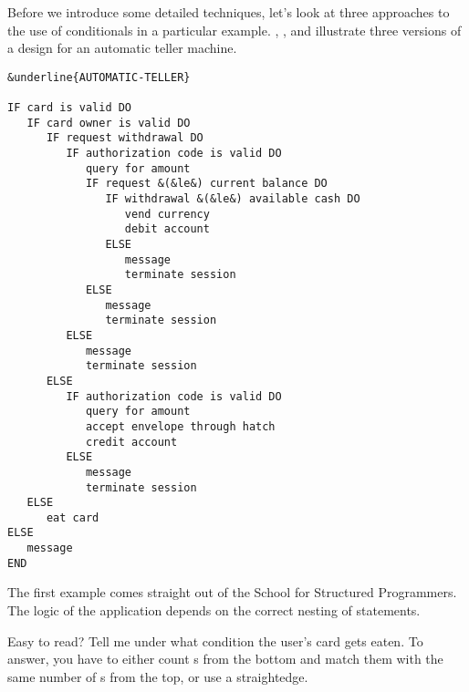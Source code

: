 %
Before we introduce some detailed techniques, let's look at three approaches
to the use of conditionals in a particular example. ,
, and  illustrate three versions of a design for an
automatic teller machine.

\begin{figure*}[tttt]
\begin{center}
\small\begin{BVerbatim}[commandchars=\&\{\},baselinestretch=0.85]
&underline{AUTOMATIC-TELLER}

IF card is valid DO
   IF card owner is valid DO
      IF request withdrawal DO
         IF authorization code is valid DO
            query for amount
            IF request &(&le&) current balance DO
               IF withdrawal &(&le&) available cash DO
                  vend currency
                  debit account
               ELSE
                  message
                  terminate session
            ELSE
               message
               terminate session
         ELSE
            message
            terminate session
      ELSE
         IF authorization code is valid DO
            query for amount
            accept envelope through hatch
            credit account
         ELSE
            message
            terminate session
   ELSE
      eat card
ELSE
   message
END
\end{BVerbatim}
\end{center}
\end{figure*}
The first example comes straight out of the School for Structured
Programmers. The logic of the application depends on the correct nesting
of  statements.

Easy to read? Tell me under what condition the user's card gets
eaten. To answer, you have to either count s from the bottom and
match them with the same number of s from the top, or use a
straightedge.

